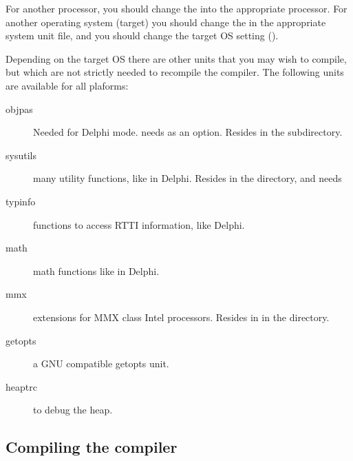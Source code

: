 \documentclass{report}
\begin{document}
For another processor, you should change the  into the appropriate
processor. For another operating system (target) you should change the
 in the appropriate system unit file, and you should change
the target OS setting ().

Depending on the target OS there are other units that you may wish to
compile, but which are not strictly needed to recompile the compiler.
The following units are available for all plaforms:
\begin{description}
\item[objpas] Needed for Delphi mode. needs  as an option. Resides
in the  subdirectory.
\item[sysutils] many utility functions, like in Delphi. Resides in the
 directory, and needs 
\item[typinfo] functions to access RTTI information, like Delphi.
\item[math] math functions like in Delphi.
\item[mmx] extensions for MMX class Intel processors. Resides in
in the  directory.
\item[getopts] a GNU compatible getopts unit.
\item[heaptrc] to debug the heap.
\end{description}

\subsection{Compiling the compiler}
\end{document}
